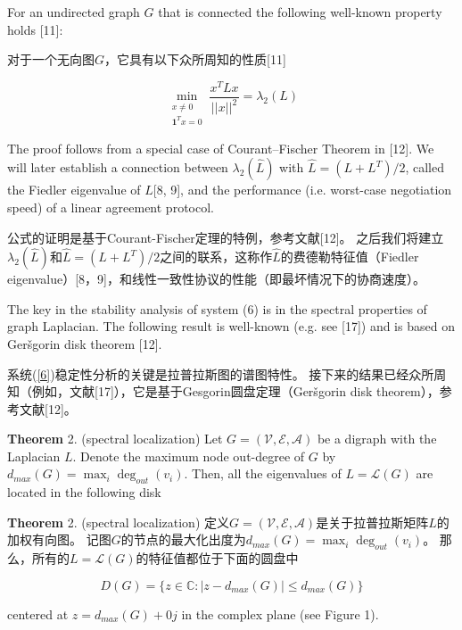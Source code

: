 \documentclass{article}
\begin{document}
{\color[gray]{0.5}
For an undirected graph $G$ that is connected the following well-known property holds [11]:
}

对于一个无向图$G$，它具有以下众所周知的性质[11]

\begin{equation}
    \min_{\substack{x\ne 0\\   \mathbf{1}^Tx=0}} \frac{x^T Lx}{||x||^2}=\lambda_2(L)
    \tag{14}
    \label{14}
\end{equation}

{\color[gray]{0.5}
\noindent The proof follows from a special case of Courant–Fischer Theorem in [12]. 
We will later establish a connection between $\lambda_2(\hat{L})$ with $\hat{L}=(L+L^T)/2$, called the Fiedler eigenvalue of $\hat{L}$[8, 9], and the performance (i.e. worst-case negotiation speed) of a linear agreement protocol.
}

\noindent 公式的证明是基于Courant-Fischer定理的特例，参考文献[12]。
之后我们将建立$\lambda_2(\hat{L})$和$\hat{L}=(L+L^T)/2$之间的联系，这称作$\hat{L}$的费德勒特征值（Fiedler eigenvalue）[8，9]，和线性一致性协议的性能（即最坏情况下的协商速度）。

{\color[gray]{0.5}
The key in the stability analysis of system (6) is in the spectral properties of graph Laplacian. 
The following result is well-known (e.g. see [17]) and is based on Ger\v sgorin disk theorem [12].
}

系统(\ref{6})稳定性分析的关键是拉普拉斯图的谱图特性。
接下来的结果已经众所周知（例如，文献[17]），它是基于Gesgorin圆盘定理（Ger\v sgorin disk theorem），参考文献[12]。

{\color[gray]{0.5}
\noindent \textbf{Theorem} 2. (spectral localization) Let $G=(\mathcal{V},\mathcal{E},\mathcal{A})$ be a digraph with the Laplacian $L$. 
Denote the maximum node out-degree of $G$ by $d_{max}(G) = \max_i \deg_{out}(v_i)$. 
Then, all the eigenvalues of $L=\mathcal{L}(G)$ are located in the following disk
}

\noindent \textbf{Theorem} 2. (spectral localization) 定义$G=(\mathcal{V},\mathcal{E},\mathcal{A})$是关于拉普拉斯矩阵$L$的加权有向图。
记图$G$的节点的最大化出度为$d_{max}(G) = \max_i \deg_{out}(v_i)$。
那么，所有的$L=\mathcal{L}(G)$的特征值都位于下面的圆盘中

\begin{equation}
    D(G) = \{ z\in \mathbb{C}: |z-d_{max}(G)| \le d_{max}(G) \}
    \tag{15}
    \label{15}
\end{equation}

{\color[gray]{0.5}
\noindent centered at $z=d_{max}(G)+0j$ in the complex plane (see Figure 1).
}
\end{document}
